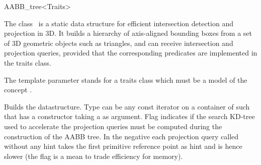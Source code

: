 \ccRefPageBegin


\begin{ccRefClass}{AABB_tree<Traits>}  %


\ccDefinition
  
The class \ccRefName\ is a static data structure for efficient intersection detection and projection in 3D. It builds a hierarchy of axis-aligned bounding boxes from a set of 3D geometric objects such as triangles, and can receive intersection and projection queries, provided that the corresponding predicates are implemented in the traits class. 

The template parameter  stands for a traits class which must be a model of the concept .


\ccTypes

\ccGlue
{}
\ccGlue
{}
\ccGlue
{}

\ccCreation
{}  %

{Builds the datastructure. Type  can be any const iterator on a container of  such that  has a constructor taking a  as argument. Flag  indicates if the search KD-tree used to accelerate the projection queries must be computed during the construction of the AABB tree. In the negative each projection query called without any hint takes the first primitive reference point as hint and is hence slower (the flag is a mean to trade efficiency for memory). }


\end{ccRefClass}
